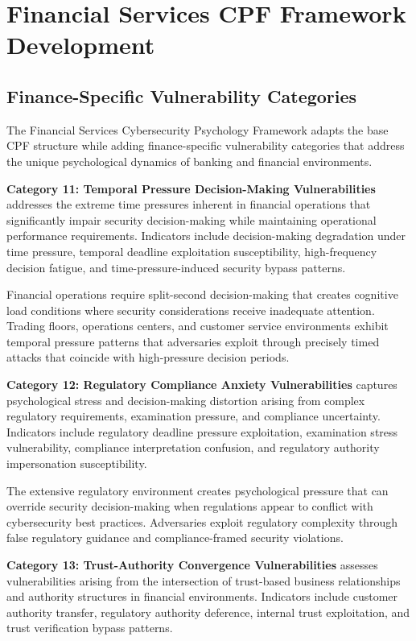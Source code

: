 \documentclass[10pt, twocolumn]{article}
\begin{document}
\section{Financial Services CPF Framework Development}

\subsection{Finance-Specific Vulnerability Categories}

The Financial Services Cybersecurity Psychology Framework adapts the base CPF structure while adding finance-specific vulnerability categories that address the unique psychological dynamics of banking and financial environments.

\textbf{Category 11: Temporal Pressure Decision-Making Vulnerabilities} addresses the extreme time pressures inherent in financial operations that significantly impair security decision-making while maintaining operational performance requirements. Indicators include decision-making degradation under time pressure, temporal deadline exploitation susceptibility, high-frequency decision fatigue, and time-pressure-induced security bypass patterns.

Financial operations require split-second decision-making that creates cognitive load conditions where security considerations receive inadequate attention. Trading floors, operations centers, and customer service environments exhibit temporal pressure patterns that adversaries exploit through precisely timed attacks that coincide with high-pressure decision periods.

\textbf{Category 12: Regulatory Compliance Anxiety Vulnerabilities} captures psychological stress and decision-making distortion arising from complex regulatory requirements, examination pressure, and compliance uncertainty. Indicators include regulatory deadline pressure exploitation, examination stress vulnerability, compliance interpretation confusion, and regulatory authority impersonation susceptibility.

The extensive regulatory environment creates psychological pressure that can override security decision-making when regulations appear to conflict with cybersecurity best practices. Adversaries exploit regulatory complexity through false regulatory guidance and compliance-framed security violations.

\textbf{Category 13: Trust-Authority Convergence Vulnerabilities} assesses vulnerabilities arising from the intersection of trust-based business relationships and authority structures in financial environments. Indicators include customer authority transfer, regulatory authority deference, internal trust exploitation, and trust verification bypass patterns.
\end{document}
